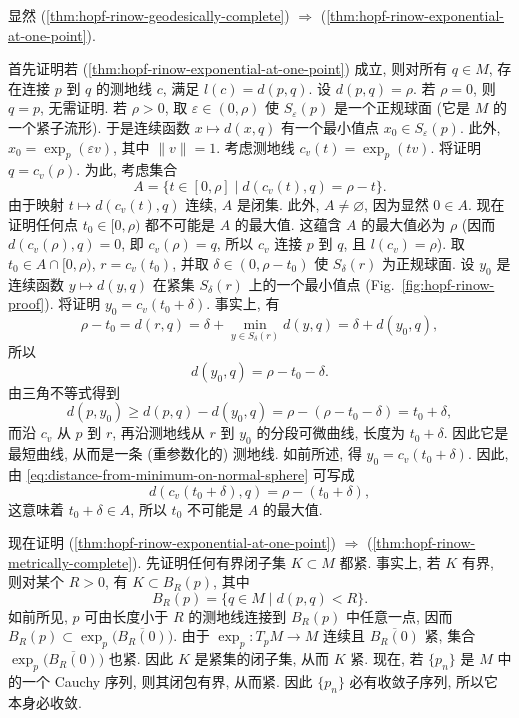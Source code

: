 \begin{RiemannProof}
显然 (\ref{thm:hopf-rinow-geodesically-complete}) $\Rightarrow$ (\ref{thm:hopf-rinow-exponential-at-one-point}).

首先证明若 (\ref{thm:hopf-rinow-exponential-at-one-point}) 成立, 则对所有 $q\in M$, 存在连接 $p$ 到 $q$ 的测地线 $c$, 满足 $l(c)=d(p,q)$. 设 $d(p,q)=\rho$. 若 $\rho=0$, 则 $q=p$, 无需证明. 若 $\rho>0$, 取 $\varepsilon\in(0,\rho)$ 使 $S_\varepsilon(p)$ 是一个正规球面 (它是 $M$ 的一个紧子流形). 于是连续函数 $x\mapsto d(x,q)$ 有一个最小值点 $x_0\in S_\varepsilon(p)$. 此外, $x_0=\exp_p(\varepsilon v)$, 其中 $\lVert v\rVert=1$. 考虑测地线 $c_v(t)=\exp_p(tv)$. 将证明 $q=c_v(\rho)$. 为此, 考虑集合
\[
  A=\{t\in[0,\rho]\mid d(c_v(t),q)=\rho-t\}.
\]
由于映射 $t\mapsto d(c_v(t),q)$ 连续, $A$ 是闭集. 此外, $A\ne\varnothing$, 因为显然 $0\in A$. 现在证明任何点 $t_0\in[0,\rho)$ 都不可能是 $A$ 的最大值. 这蕴含 $A$ 的最大值必为 $\rho$ (因而 $d(c_v(\rho),q)=0$, 即 $c_v(\rho)=q$, 所以 $c_v$ 连接 $p$ 到 $q$, 且 $l(c_v)=\rho$). 取 $t_0\in A\cap[0,\rho)$, $r=c_v(t_0)$, 并取 $\delta\in(0,\rho-t_0)$ 使 $S_\delta(r)$ 为正规球面. 设 $y_0$ 是连续函数 $y\mapsto d(y,q)$ 在紧集 $S_\delta(r)$ 上的一个最小值点 (Fig.~\ref{fig:hopf-rinow-proof}). 将证明 $y_0=c_v(t_0+\delta)$. 事实上, 有
\[
  \rho-t_0=d(r,q)=\delta+\min_{y\in S_\delta(r)}d(y,q)=\delta+d(y_0,q),
\]
所以
\begin{equation}\label{eq:distance-from-minimum-on-normal-sphere}
  d(y_0,q)=\rho-t_0-\delta.
\end{equation}
由三角不等式得到
\[
  d(p,y_0)\geq d(p,q)-d(y_0,q)=\rho-(\rho-t_0-\delta)=t_0+\delta,
\]
而沿 $c_v$ 从 $p$ 到 $r$, 再沿测地线从 $r$ 到 $y_0$ 的分段可微曲线, 长度为 $t_0+\delta$. 因此它是最短曲线, 从而是一条 (重参数化的) 测地线. 如前所述, 得 $y_0=c_v(t_0+\delta)$. 因此, 由 \eqref{eq:distance-from-minimum-on-normal-sphere} 可写成
\[
  d(c_v(t_0+\delta),q)=\rho-(t_0+\delta),
\]
这意味着 $t_0+\delta\in A$, 所以 $t_0$ 不可能是 $A$ 的最大值.

现在证明 (\ref{thm:hopf-rinow-exponential-at-one-point}) $\Rightarrow$ (\ref{thm:hopf-rinow-metrically-complete}). 先证明任何有界闭子集 $K\subset M$ 都紧. 事实上, 若 $K$ 有界, 则对某个 $R>0$, 有 $K\subset B_R(p)$, 其中
\[
  B_R(p)=\{q\in M\mid d(p,q)<R\}.
\]
如前所见, $p$ 可由长度小于 $R$ 的测地线连接到 $B_R(p)$ 中任意一点, 因而 $B_R(p)\subset\exp_p\bigl(\overline{B_R(0)}\bigr)$. 由于 $\exp_p:T_pM\to M$ 连续且 $\overline{B_R(0)}$ 紧, 集合 $\exp_p\bigl(\overline{B_R(0)}\bigr)$ 也紧. 因此 $K$ 是紧集的闭子集, 从而 $K$ 紧. 现在, 若 $\{p_n\}$ 是 $M$ 中的一个 Cauchy 序列, 则其闭包有界, 从而紧. 因此 $\{p_n\}$ 必有收敛子序列, 所以它本身必收敛.


\end{RiemannProof}
